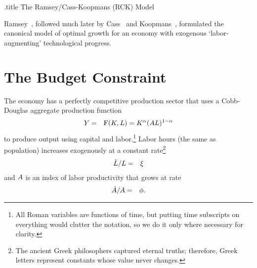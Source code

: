 \documentclass{handout}
\begin{document}
\handoutHeader

\begin{verbatimwrite}{\jobname.title}
The Ramsey/Cass-Koopmans (RCK) Model
\end{verbatimwrite}

\handoutNameMake



\renewcommand{\cite}{\citeyearpar}

Ramsey~\cite{ramseySave}, followed much later by Cass~\cite{cass:growth} and Koopmans~\cite{koopmans:growth}, formulated the canonical model of optimal growth for an economy with exogenous `labor-augmenting' technological progress.

\section{The Budget Constraint}

The economy has a perfectly competitive production sector that uses a Cobb-Douglas aggregate production function 
\begin{eqnarray}
        {Y} & = & \mathrm{F}({K},L) = {K}^{\alpha}(A L)^{1-\alpha}
\end{eqnarray}
to produce output using capital and labor.\footnote{All Roman variables are functions of time, but putting time subscripts on everything would clutter the notation, so we do it only where necessary for clarity.}  Labor hours (the same as population) increases exogenously at a constant rate\footnote{The ancient Greek philosophers captured eternal truths; therefore, Greek letters represent constants whose value never changes.}
\begin{eqnarray}
        \dot{L}/L & = & \xi
\end{eqnarray}
and $A $ is an index of labor productivity that grows at rate 
\begin{eqnarray}
        \dot{A }/A  & = & \phi. 
\end{eqnarray}
\end{document}

